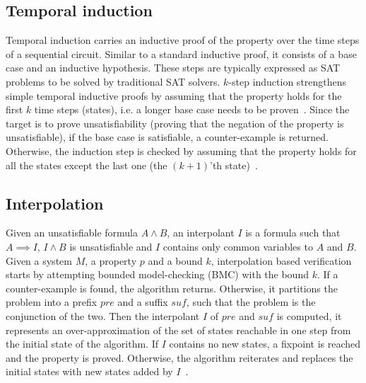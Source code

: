 \subsection{Temporal induction}
Temporal induction carries an inductive proof of the property 
over the time steps of a sequential circuit.
Similar to a standard inductive proof, it consists of a base
case and an inductive hypothesis. These steps are typically 
expressed as SAT problems to be solved by traditional SAT solvers.  
$k$-step induction strengthens simple temporal inductive proofs 
by assuming that the property holds for the first $k$ time steps (states), 
i.e. a longer base case needs to be proven~\cite{een2003temporal}. Since the target is
to prove unsatisfiability (proving that the negation of the property 
is unsatisfiable), if the base case is satisfiable, a counter-example 
is returned. Otherwise, the induction step is checked by assuming that
the property holds for all the states except the last one (the $(k+1)$'th 
state)~\cite{biere2009handbook}.   

\subsection{Interpolation}
Given an unsatisfiable formula $A \land B$, an interpolant $I$ is
a formula such that $A \implies I$, $I \land B$ is unsatisfiable and
$I$ contains only common variables to $A$ and $B$. 
Given a system $M$, a property $p$ and a bound $k$, interpolation
based verification starts by attempting bounded model-checking (BMC) with the bound $k$. 
If a counter-example is found, the algorithm returns. Otherwise, it
partitions the problem into a prefix $pre$ and a suffix $suf$, such that the 
problem is the conjunction of the two. 
Then the interpolant $I$ of $\mathit{pre}$ and $\mathit{suf}$ is computed, it represents
an over-approximation of the set of states reachable in one step from the initial state
of the algorithm. If $I$ contains no new states, a fixpoint is reached 
and the property is proved. Otherwise, the algorithm reiterates and replaces
the initial states with new states added by $I$~\cite{amla2005analysis}. 

